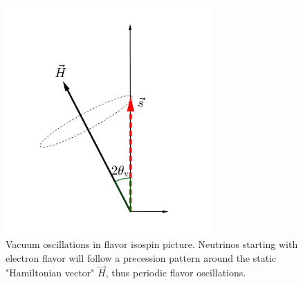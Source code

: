 \begin{figure}
    \centering
    \vspace*{-20pt}
    \includegraphics[width=0.7\textwidth]{chapters/assets/basics/flavor-isospin-vac-osc}
    \caption{Vacuum oscillations in flavor isospin picture. Neutrinos starting with electron flavor will follow a precession pattern around the static "Hamiltonian vector" $\vec H$, thus periodic flavor oscillations.}
    \label{chap:basics-sec:flavor-isospin-pic-fig:flavor-isospin-vac-osc}
\end{figure}


